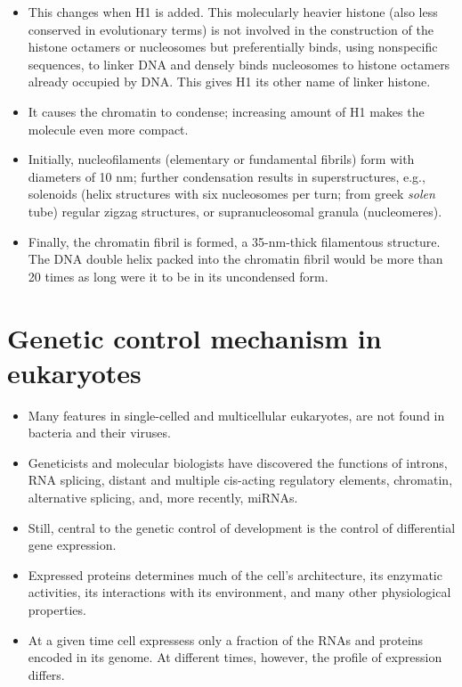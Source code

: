 \documentclass[11pt,dvipsnames,ignorenonframetext,aspectratio=169]{beamer}
\providecommand{\tightlist}{%
  \setlength{\itemsep}{0pt}\setlength{\parskip}{0pt}}
\begin{document}
\begin{frame}{}
\protect\hypertarget{section-12}{}

\small

\begin{itemize}
\tightlist
\item
  This changes when H1 is added. This molecularly heavier histone (also
  less conserved in evolutionary terms) is not involved in the
  construction of the histone octamers or nucleosomes but preferentially
  binds, using nonspecific sequences, to linker DNA and densely binds
  nucleosomes to histone octamers already occupied by DNA. This gives H1
  its other name of linker histone.
\item
  It causes the chromatin to condense; increasing amount of H1 makes the
  molecule even more compact.
\item
  Initially, nucleofilaments (elementary or fundamental fibrils) form
  with diameters of 10 nm; further condensation results in
  superstructures, e.g., solenoids (helix structures with six
  nucleosomes per turn; from greek \emph{solen} tube) regular zigzag
  structures, or supranucleosomal granula (nucleomeres).
\item
  Finally, the chromatin fibril is formed, a 35-nm-thick filamentous
  structure. The DNA double helix packed into the chromatin fibril would
  be more than 20 times as long were it to be in its uncondensed form.
\end{itemize}

\end{frame}

\hypertarget{genetic-control-mechanism-in-eukaryotes}{%
\section{Genetic control mechanism in
eukaryotes}\label{genetic-control-mechanism-in-eukaryotes}}

\begin{frame}{}
\protect\hypertarget{section-13}{}

\begin{itemize}
\tightlist
\item
  Many features in single-celled and multicellular eukaryotes, are not
  found in bacteria and their viruses.
\item
  Geneticists and molecular biologists have discovered the functions of
  introns, RNA splicing, distant and multiple cis-acting regulatory
  elements, chromatin, alternative splicing, and, more recently, miRNAs.
\item
  Still, central to the genetic control of development is the control of
  differential gene expression.
\item
  Expressed proteins determines much of the cell's architecture, its
  enzymatic activities, its interactions with its environment, and many
  other physiological properties.
\item
  At a given time cell expressess only a fraction of the RNAs and
  proteins encoded in its genome. At different times, however, the
  profile of expression differs.
\end{itemize}

\end{frame}
\end{document}
